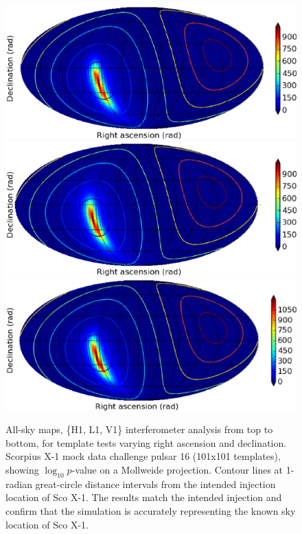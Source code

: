 \begin{figure}
\begin{center}
\includegraphics[width=0.6\paperwidth,height=0.2\paperheight]{maptrueH1.eps}
\includegraphics[width=0.6\paperwidth,height=0.2\paperheight]{maptrueL1.eps}
\includegraphics[width=0.6\paperwidth,height=0.2\paperheight]{maptrueV1.eps}
\caption{ All-sky maps, \{H1, L1, V1\} interferometer analysis from top to bottom, for template tests varying right ascension and declination. 
Scorpius X-1 mock data challenge pulsar 16 (101x101 templates), showing $\log_{10}p$-value on a Mollweide projection.
Contour lines at 1-radian great-circle distance intervals from the intended injection location of Sco X-1.
The results match the intended injection and confirm that the simulation is accurately representing the known sky location of Sco X-1.
}
\label{scox1-allsky-maps}
\end{center}
\end{figure}

